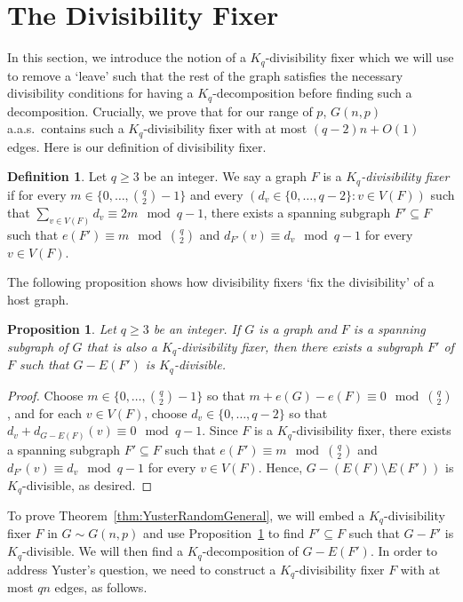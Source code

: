 \documentclass[11pt]{article}
\numberwithin{equation}{section}
\newcounter{i}
\theoremstyle{plain}
\newtheorem{proposition}[thm]{Proposition}
\theoremstyle{plain} %
\theoremstyle{definition}
\newtheorem{definition}[thm]{Definition}
\newcommand{\aas}{a.a.s.\ }
\begin{document}
\section{The Divisibility Fixer}\label{s:DivFixer}

In this section, we introduce the notion of a $K_q$-divisibility fixer which we will use to remove a `leave' such that the rest of the graph satisfies the necessary divisibility conditions for having a $K_q$-decomposition before finding such a decomposition. Crucially, we prove that for our range of $p$, $G(n,p)$ \aas contains such a $K_q$-divisibility fixer with at most $(q-2)n+O(1)$ edges. 
Here is our definition of divisibility fixer.

\begin{definition}\label{def:DivFixer}
Let $q \ge 3$ be an integer.  We say a graph $F$ is a \textit{$K_q$-divisibility fixer} if for every $m \in \{0, \dots, \binom{q}{2}-1\}$ and every $(d_v \in \{0, \dots, q - 2\} : v \in V(F))$ such that $\sum_{v\in V(F)}d_v \equiv 2m \mod q - 1$, there exists a spanning subgraph $F' \subseteq F$ such that $e(F') \equiv m \mod \binom{q}{2}$ and $d_{F'}(v) \equiv d_v \mod q - 1$ for every $v \in V(F)$.
\end{definition}

The following proposition shows how divisibility fixers `fix the divisibility' of a host graph.

\begin{proposition}\label{prop:DivFixer}
Let $q\ge 3$ be an integer. If $G$ is a graph and $F$ is a spanning subgraph of $G$ that is also a $K_q$-divisibility fixer, then there exists a subgraph $F'$ of $F$ such that $G-E(F')$ is $K_q$-divisible.     
\end{proposition}
\begin{proof}
    Choose $m \in \{0, \dots, \binom{q}{2}-1\}$ so that $m + e(G) - e(F) \equiv 0 \mod \binom{q}{2}$, and for each $v \in V(F)$, choose $d_v \in \{0, \dots, q - 2\}$ so that $d_v + d_{G-E(F)}(v) \equiv 0\mod q - 1$.
    Since $F$ is a $K_q$-divisibility fixer, there exists a spanning subgraph $F' \subseteq F$ such that $e(F') \equiv m \mod \binom{q}{2}$ and $d_{F'}(v) \equiv d_v \mod q - 1$ for every $v \in V(F)$.  Hence,  $G - (E(F) \setminus E(F'))$ is $K_q$-divisible, as desired.
\end{proof}

To prove Theorem~\ref{thm:YusterRandomGeneral}, we will embed a $K_q$-divisibility fixer $F$ in $G \sim G(n,p)$ and use Proposition~\ref{prop:DivFixer} to find $F' \subseteq F$ such that $G - F'$ is $K_q$-divisible.  We will then find a $K_q$-decomposition of $G - E(F')$.  
In order to address Yuster's question, we need to construct a $K_q$-divisibility fixer $F$ with at most $qn$ edges, as follows.
\end{document}
